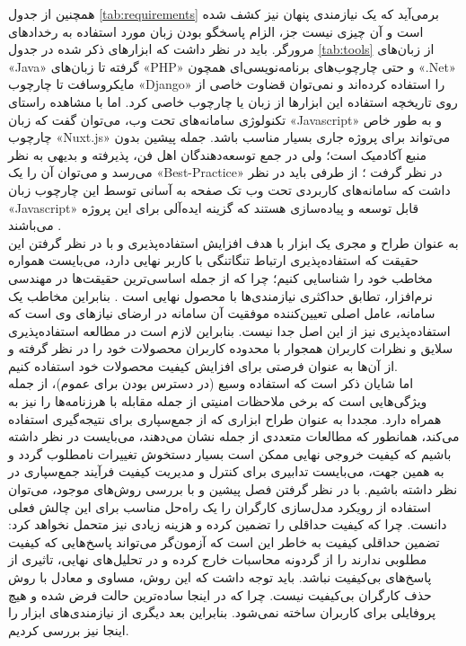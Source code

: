 همچنین از جدول
\ref{tab:requirements}
برمی‌آید که یک نیازمندی پنهان نیز کشف شده است و آن چیزی نیست جز، الزام پاسخگو بودن زبان مورد استفاده به رخدادهای مرورگر. باید در نظر داشت که ابزارهای ذکر شده در جدول
\ref{tab:tools}
از زبان‌های
«Java»
گرفته تا زبان‌های
«PHP»
و حتی چارچوب‌های برنامه‌نویسی‌ای
همچون
«.Net»
مایکروسافت تا چارچوب
«Django»
را استفاده کرده‌اند و نمی‌توان قضاوت خاصی از روی تاریخچه استفاده این ابزارها از زبان یا چارچوب خاصی کرد. اما با مشاهده راستای
تکنولوژی سامانه‌های تحت وب، می‌توان گفت که زبان
«Javascript»
و به طور خاص چارچوب
«Nuxt.js»
می‌تواند برای پروژه جاری بسیار مناسب باشد. جمله پیشین بدون منبع آکادمیک است؛ ولی در جمع توسعه‌دهندگان اهل فن، پذیرفته و بدیهی به نظر می‌رسد و می‌توان آن را یک
«Best-Practice»
در نظر گرفت
\cite{noauthor_curated_2018, sozo_10_2018, noauthor_creating_nodate}؛
از طرفی  باید در نظر داشت که سامانه‌های کاربردی تحت وب تک صفحه
به آسانی توسط این چارچوب زبان
«Javascript»
قابل توسعه و پیاده‌سازی هستند که گزینه ایده‌آلی برای این پروژه می‌باشند
\cite{ardalis_choose_nodate, neoteric_single-page_2016}.\\
به عنوان طراح و مجری یک ابزار با هدف افزایش استفاده‌پذیری و با در نظر گرفتن این حقیقت که استفاده‌پذیری ارتباط تنگاتنگی با کاربر نهایی دارد، می‌بایست همواره مخاطب خود را شناسایی کنیم؛ چرا که از جمله‌ اساسی‌ترین حقیقت‌ها در مهندسی نرم‌افزار، تطابق حداکثری نیازمندی‌ها با محصول نهایی است
\cite{sommerville_software_2016}.
بنابراین مخاطب یک سامانه، عامل اصلی تعیین‌کننده موفقیت آن سامانه در ارضای نیازهای وی است که استفاده‌پذیری نیز از این اصل جدا نیست. بنابراین لازم است در مطالعه استفاده‌پذیری سلایق و نظرات کاربران همجوار با محدوده کاربران محصولات خود را در نظر گرفته و از آن‌ها به عنوان فرصتی برای افزایش کیفیت محصولات خود استفاده کنیم.\\
اما شایان ذکر است که استفاده وسیع (در دسترس بودن برای عموم)، از جمله ویژگی‌هایی است که برخی ملاحظات امنیتی از جمله مقابله با هرزنامه‌ها را نیز به همراه دارد. مجددا به عنوان طراح ابزاری که از جمع‌سپاری برای نتیجه‌گیری استفاده می‌کند، همانطور که مطالعات متعددی از جمله
\cite{li_crowdsourced_2016}
نشان می‌دهند، می‌بایست در نظر داشته باشیم که کیفیت خروجی نهایی ممکن است بسیار دستخوش تغییرات نامطلوب گردد و به همین جهت، می‌بایست تدابیری برای کنترل و مدیریت کیفیت فرآیند جمع‌سپاری در نظر داشته باشیم. با در نظر گرفتن فصل پیشین و با بررسی روش‌های موجود، می‌توان استفاده از رویکرد مدل‌سازی کارگران را یک راه‌حل مناسب برای این چالش فعلی دانست. چرا که کیفیت حداقلی را تضمین کرده و هزینه زیادی نیز متحمل نخواهد کرد: تضمین حداقلی کیفیت به خاطر این است که آزمون‌گر می‌تواند پاسخ‌هایی که کیفیت مطلوبی ندارند را از گردونه محاسبات خارج کرده و در تحلیل‌های نهایی، تاثیری از پاسخ‌های بی‌کیفیت نباشد. باید توجه داشت که این روش، مساوی و معادل با روش حذف کارگران بی‌کیفیت نیست. چرا که در اینجا ساده‌ترین حالت فرض شده و هیچ پروفایلی برای کاربران ساخته نمی‌شود. بنابراین بعد دیگری از نیازمندی‌های ابزار را اینجا نیز بررسی کردیم.\\
